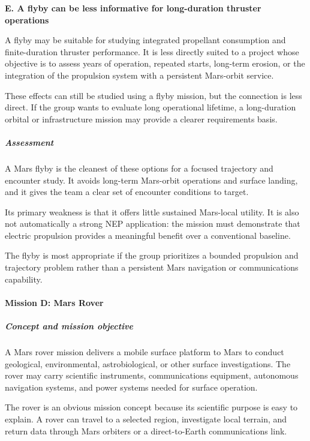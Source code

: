 \textbf{E. A flyby can be less informative for long-duration
	thruster operations}

A flyby may be suitable for studying integrated propellant
consumption and finite-duration thruster performance. It is
less directly suited to a project whose objective is to assess
years of operation, repeated starts, long-term erosion, or
the integration of the propulsion system with a persistent
Mars-orbit service.

These effects can still be studied using a flyby mission,
but the connection is less direct. If the group wants to
evaluate long operational lifetime, a long-duration orbital
or infrastructure mission may provide a clearer requirements
basis.

\subparagraph{Assessment}

A Mars flyby is the cleanest of these options for a focused
trajectory and encounter study. It avoids long-term Mars-orbit
operations and surface landing, and it gives the team a clear
set of encounter conditions to target.

Its primary weakness is that it offers little sustained Mars-local
utility. It is also not automatically a strong NEP application:
the mission must demonstrate that electric propulsion provides
a meaningful benefit over a conventional baseline.

The flyby is most appropriate if the group prioritizes a bounded
propulsion and trajectory problem rather than a persistent
Mars navigation or communications capability.

\paragraph{Mission D: Mars Rover}

\subparagraph{Concept and mission objective}

A Mars rover mission delivers a mobile surface platform to
Mars to conduct geological, environmental, astrobiological,
or other surface investigations. The rover may carry scientific
instruments, communications equipment, autonomous navigation
systems, and power systems needed for surface operation.

The rover is an obvious mission concept because its scientific
purpose is easy to explain. A rover can travel to a selected
region, investigate local terrain, and return data through
Mars orbiters or a direct-to-Earth communications link.


